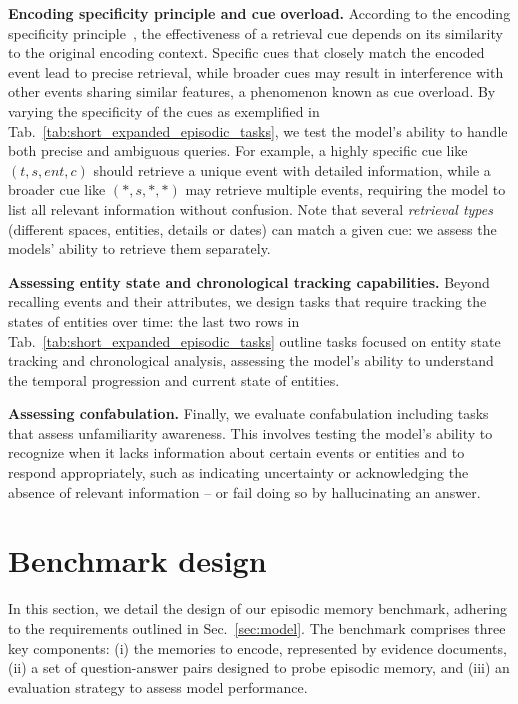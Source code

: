 \documentclass{article}
\begin{document}
\noindent \textbf{Encoding specificity principle and cue overload.}
According to the encoding specificity principle~\citep{Tulving1973}, the effectiveness of a retrieval cue depends on its similarity to the original encoding context. Specific cues that closely match the encoded event lead to precise retrieval, while broader cues may result in interference with other events sharing similar features, a phenomenon known as cue overload. By varying the specificity of the cues as exemplified in Tab.~\ref{tab:short_expanded_episodic_tasks}, we test the model's ability to handle both precise and ambiguous queries. For example, a highly specific cue like $(t, s, ent, c)$ should retrieve a unique event with detailed information, while a broader cue like $(*, s, *, *)$ may retrieve multiple events, requiring the model to list all relevant information without confusion.
Note that several \textit{retrieval types} (different spaces, entities, details or dates) can match a given cue: we assess the models' ability to retrieve them separately.

\noindent \textbf{Assessing entity state and chronological tracking capabilities.}
Beyond recalling events and their attributes, we design tasks that require tracking the states of entities over time: the last two rows in Tab.~\ref{tab:short_expanded_episodic_tasks} outline tasks focused on entity state tracking and chronological analysis, assessing the model's ability to understand the temporal progression and current state of entities.

\noindent \textbf{Assessing confabulation.}
Finally, we evaluate confabulation including tasks that assess unfamiliarity awareness. This involves testing the model's ability to recognize when it lacks information about certain events or entities and to respond appropriately, such as indicating uncertainty or acknowledging the absence of relevant information -- or fail doing so by hallucinating an answer.

\section{Benchmark design}\label{sec:implementation}

In this section, we detail the design of our episodic memory benchmark, adhering to the requirements outlined in Sec.~\ref{sec:model}. The benchmark comprises three key components: (i) the memories to encode, represented by evidence documents, (ii) a set of question-answer pairs designed to probe episodic memory, and (iii) an evaluation strategy to assess model performance.
\end{document}
